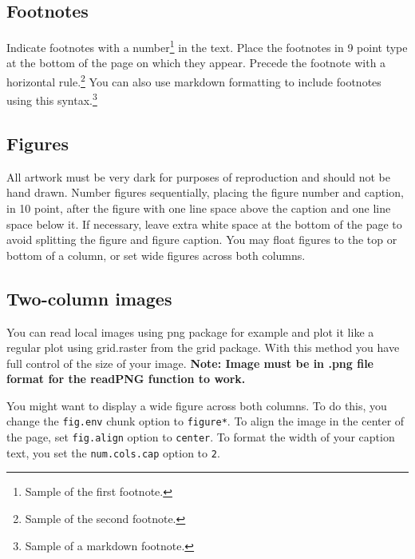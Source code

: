 \documentclass[10pt, letterpaper]{article}
\begin{document}
\subsection{Footnotes}\label{footnotes}

Indicate footnotes with a number\footnote{Sample of the first
footnote.} in the text. Place the footnotes in 9 point type at the
bottom of the page on which they appear. Precede the footnote with a
horizontal rule.\footnote{Sample of the second footnote.} You can also
use markdown formatting to include footnotes using this
syntax.\footnote{Sample of a markdown footnote.}

\subsection{Figures}\label{figures}

All artwork must be very dark for purposes of reproduction and should
not be hand drawn. Number figures sequentially, placing the figure
number and caption, in 10 point, after the figure with one line space
above the caption and one line space below it. If necessary, leave extra
white space at the bottom of the page to avoid splitting the figure and
figure caption. You may float figures to the top or bottom of a column,
or set wide figures across both columns.

\subsection{Two-column images}\label{two-column-images}

You can read local images using png package for example and plot it like
a regular plot using grid.raster from the grid package. With this method
you have full control of the size of your image. \textbf{Note: Image
must be in .png file format for the readPNG function to work.}

You might want to display a wide figure across both columns. To do this,
you change the \texttt{fig.env} chunk option to \texttt{figure*}. To
align the image in the center of the page, set \texttt{fig.align} option
to \texttt{center}. To format the width of your caption text, you set
the \texttt{num.cols.cap} option to \texttt{2}.
\end{document}
